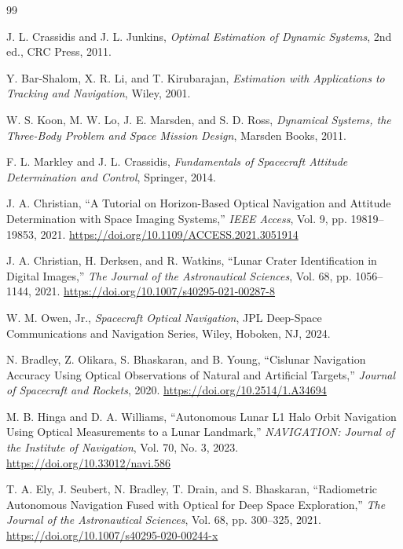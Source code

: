 \documentclass[10pt,twocolumn]{article}
\begin{document}
\begin{thebibliography}{99}

J. L. Crassidis and J. L. Junkins, \textit{Optimal Estimation of Dynamic Systems}, 2nd ed., CRC Press, 2011.

Y. Bar-Shalom, X. R. Li, and T. Kirubarajan, \textit{Estimation with Applications to Tracking and Navigation}, Wiley, 2001.

W. S. Koon, M. W. Lo, J. E. Marsden, and S. D. Ross, \textit{Dynamical Systems, the Three-Body Problem and Space Mission Design}, Marsden Books, 2011.

F. L. Markley and J. L. Crassidis, \textit{Fundamentals of Spacecraft Attitude Determination and Control}, Springer, 2014.

J. A. Christian, ``A Tutorial on Horizon-Based Optical Navigation and Attitude Determination with Space Imaging Systems,'' \textit{IEEE Access}, Vol. 9, pp. 19819--19853, 2021. \url{https://doi.org/10.1109/ACCESS.2021.3051914}

J. A. Christian, H. Derksen, and R. Watkins, ``Lunar Crater Identification in Digital Images,'' \textit{The Journal of the Astronautical Sciences}, Vol. 68, pp. 1056--1144, 2021. \url{https://doi.org/10.1007/s40295-021-00287-8}

W. M. Owen, Jr., \textit{Spacecraft Optical Navigation}, JPL Deep-Space Communications and Navigation Series, Wiley, Hoboken, NJ, 2024.

N. Bradley, Z. Olikara, S. Bhaskaran, and B. Young, ``Cislunar Navigation Accuracy Using Optical Observations of Natural and Artificial Targets,'' \textit{Journal of Spacecraft and Rockets}, 2020. \url{https://doi.org/10.2514/1.A34694}

M. B. Hinga and D. A. Williams, ``Autonomous Lunar L1 Halo Orbit Navigation Using Optical Measurements to a Lunar Landmark,'' \textit{NAVIGATION: Journal of the Institute of Navigation}, Vol. 70, No. 3, 2023. \url{https://doi.org/10.33012/navi.586}

T. A. Ely, J. Seubert, N. Bradley, T. Drain, and S. Bhaskaran, ``Radiometric Autonomous Navigation Fused with Optical for Deep Space Exploration,'' \textit{The Journal of the Astronautical Sciences}, Vol. 68, pp. 300--325, 2021. \url{https://doi.org/10.1007/s40295-020-00244-x}


\end{thebibliography}
\end{document}

